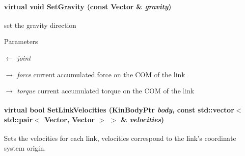 \hypertarget{classOpenRAVE_1_1PhysicsEngineBase_abf9cb070312280c553bfb29079ecb5ed}{
\paragraph[{SetGravity}]{\setlength{\rightskip}{0pt plus 5cm}virtual void SetGravity (const Vector \& {\em gravity})}\hfill}
\label{classOpenRAVE_1_1PhysicsEngineBase_abf9cb070312280c553bfb29079ecb5ed}


set the gravity direction 


\begin{DoxyParams}{Parameters}
\item[\mbox{$\leftarrow$} {\em joint}]\item[\mbox{$\rightarrow$} {\em force}]current accumulated force on the COM of the link \item[\mbox{$\rightarrow$} {\em torque}]current accumulated torque on the COM of the link \end{DoxyParams}
\hypertarget{classOpenRAVE_1_1PhysicsEngineBase_af03adc7bf75eb75c954ae0396df1f193}{
\paragraph[{SetLinkVelocities}]{\setlength{\rightskip}{0pt plus 5cm}virtual bool SetLinkVelocities (KinBodyPtr {\em body}, \/  const std::vector$<$ std::pair$<$ Vector, Vector $>$ $>$ \& {\em velocities})}\hfill}
\label{classOpenRAVE_1_1PhysicsEngineBase_af03adc7bf75eb75c954ae0396df1f193}


Sets the velocities for each link, velocities correspond to the link's coordinate system origin. 


